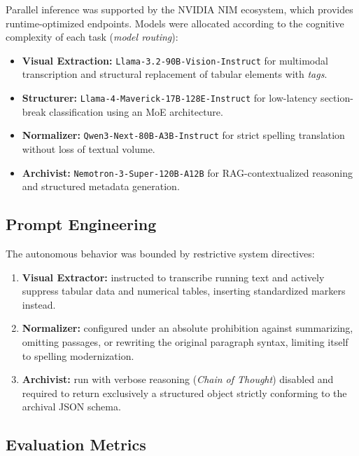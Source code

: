 \documentclass[conference]{IEEEtran}
\begin{document}
Parallel inference was supported by the NVIDIA NIM ecosystem, which provides runtime-optimized endpoints. Models were allocated according to the cognitive complexity of each task (\textit{model routing}):
\begin{itemize}
    \item \textbf{Visual Extraction:} \texttt{Llama-3.2-\allowbreak 90B-\allowbreak Vision-\allowbreak Instruct} for multimodal transcription and structural replacement of tabular elements with \textit{tags}.
    \item \textbf{Structurer:} \texttt{Llama-4-\allowbreak Maverick-\allowbreak 17B-\allowbreak 128E-\allowbreak Instruct} for low-latency section-break classification using an MoE architecture.
    \item \textbf{Normalizer:} \texttt{Qwen3-\allowbreak Next-\allowbreak 80B-\allowbreak A3B-\allowbreak Instruct} for strict spelling translation without loss of textual volume.
    \item \textbf{Archivist:} \texttt{Nemotron-3-\allowbreak Super-\allowbreak 120B-\allowbreak A12B} for RAG-contextualized reasoning and structured metadata generation.
\end{itemize}

\subsection{Prompt Engineering}

The autonomous behavior was bounded by restrictive system directives:
\begin{enumerate}
    \item \textbf{Visual Extractor:} instructed to transcribe running text and actively suppress tabular data and numerical tables, inserting standardized markers instead.
    \item \textbf{Normalizer:} configured under an absolute prohibition against summarizing, omitting passages, or rewriting the original paragraph syntax, limiting itself to spelling modernization.
    \item \textbf{Archivist:} run with verbose reasoning (\textit{Chain of Thought}) disabled and required to return exclusively a structured object strictly conforming to the archival JSON schema.
\end{enumerate}

\subsection{Evaluation Metrics}
\end{document}
